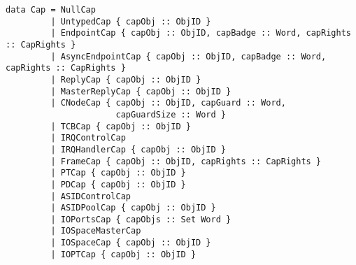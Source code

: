 \documentclass[a4paper,11pt]{article}
\begin{document}
{\small
\begin{verbatim}
data Cap = NullCap
         | UntypedCap { capObj :: ObjID } 
         | EndpointCap { capObj :: ObjID, capBadge :: Word, capRights :: CapRights }
         | AsyncEndpointCap { capObj :: ObjID, capBadge :: Word, capRights :: CapRights }
         | ReplyCap { capObj :: ObjID }
         | MasterReplyCap { capObj :: ObjID }
         | CNodeCap { capObj :: ObjID, capGuard :: Word, 
                      capGuardSize :: Word }
         | TCBCap { capObj :: ObjID }
         | IRQControlCap 
         | IRQHandlerCap { capObj :: ObjID }
         | FrameCap { capObj :: ObjID, capRights :: CapRights } 
         | PTCap { capObj :: ObjID } 
         | PDCap { capObj :: ObjID }
         | ASIDControlCap 
         | ASIDPoolCap { capObj :: ObjID }
         | IOPortsCap { capObjs :: Set Word }
         | IOSpaceMasterCap 
         | IOSpaceCap { capObj :: ObjID }
         | IOPTCap { capObj :: ObjID }
\end{verbatim}}
\end{document}

